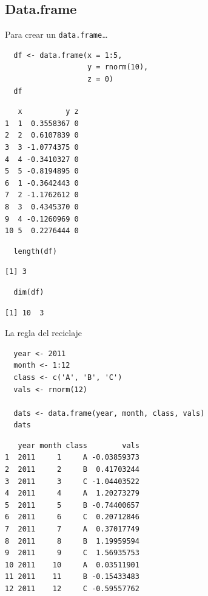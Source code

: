 \documentclass[xcolor={usenames,svgnames,dvipsnames}]{beamer}
\begin{document}
\subsection{Data.frame}
\label{sec:orgheadline33}
\begin{frame}[fragile,label={sec:orgheadline30}]{Para crear un \texttt{data.frame}\ldots{}}
 \lstset{language=R,label= ,caption= ,captionpos=b,numbers=none}
\begin{lstlisting}
  df <- data.frame(x = 1:5,
                   y = rnorm(10),
                   z = 0)
  df
\end{lstlisting}

\begin{verbatim}
   x          y z
1  1  0.3558367 0
2  2  0.6107839 0
3  3 -1.0774375 0
4  4 -0.3410327 0
5  5 -0.8194895 0
6  1 -0.3642443 0
7  2 -1.1762612 0
8  3  0.4345370 0
9  4 -0.1260969 0
10 5  0.2276444 0
\end{verbatim}

\lstset{language=R,label= ,caption= ,captionpos=b,numbers=none}
\begin{lstlisting}
  length(df)
\end{lstlisting}

\begin{verbatim}
[1] 3
\end{verbatim}

\lstset{language=R,label= ,caption= ,captionpos=b,numbers=none}
\begin{lstlisting}
  dim(df)
\end{lstlisting}

\begin{verbatim}
[1] 10  3
\end{verbatim}
\end{frame}

\begin{frame}[fragile,label={sec:orgheadline31}]{La regla del reciclaje}
 \lstset{language=R,label= ,caption= ,captionpos=b,numbers=none}
\begin{lstlisting}
  year <- 2011
  month <- 1:12
  class <- c('A', 'B', 'C')
  vals <- rnorm(12)
  
  dats <- data.frame(year, month, class, vals)
  dats
\end{lstlisting}

\begin{verbatim}
   year month class        vals
1  2011     1     A -0.03859373
2  2011     2     B  0.41703244
3  2011     3     C -1.04403522
4  2011     4     A  1.20273279
5  2011     5     B -0.74400657
6  2011     6     C  0.20712846
7  2011     7     A  0.37017749
8  2011     8     B  1.19959594
9  2011     9     C  1.56935753
10 2011    10     A  0.03511901
11 2011    11     B -0.15433483
12 2011    12     C -0.59557762
\end{verbatim}
\end{frame}
\end{document}
